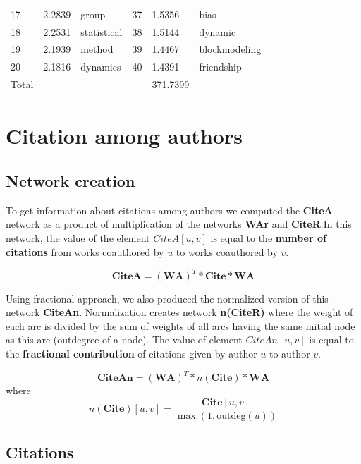 \documentclass[11pt]{article} %
\begin{document}
\begin{table}
\begin{center}
\begin{tabular}{p{0.7cm}|p{1.3cm}|p{2.1cm}||p{0.7cm}|p{1.3cm}|p{2.1cm}}
        17     &    2.2839  & group		&            37     &  1.5356 &  bias  			   \\
        18     &    2.2531  & statistical		&            38     &  1.5144 &  dynamic  	   \\
        19     &    2.1939  & method		&            39     &  1.4467 &  blockmodeling		   \\
        20     &    2.1816  & dynamics		&            40     &  1.4391 &  friendship		   \\ \hline
Total & & & & 371.7399	\\ \hline 
\end{tabular}
\end{center}
\end{table}


\section{Citation among authors}

\subsection{Network creation} 

To get information about citations among authors we computed the \textbf{CiteA} network as a product of multiplication of the networks \textbf{WAr} and \textbf{CiteR}.In this network, the value of the element $CiteA[u,v]$ is equal to the \textbf{number of citations} from works coauthored by $u$ to works coauthored by $v$. \smallskip

\[ \mathbf{CiteA} = (\mathbf{WA}) ^ T * \mathbf{Cite} * \mathbf{WA} \] 

Using fractional approach, we also produced the normalized version of this network \textbf{CiteAn}. Normalization creates network \textbf{n(CiteR)} where the weight of each arc is divided by the sum of weights of all arcs having the same initial node as this arc (outdegree of a node). The value of element $CiteAn[u,v]$ is equal to the \textbf{fractional contribution} of citations given by author $u$ to author $v$.\smallskip

\[ \mathbf{CiteAn} = (\mathbf{WA}) ^ T * n(\mathbf{Cite}) * \mathbf{WA} \]  
where 
\[ n(\mathbf{Cite})[u,v] = \frac {\mathbf{Cite}[u,v]}{\max(1,\textrm{outdeg}(u))}\]

\subsection{Citations} 
\end{document}
